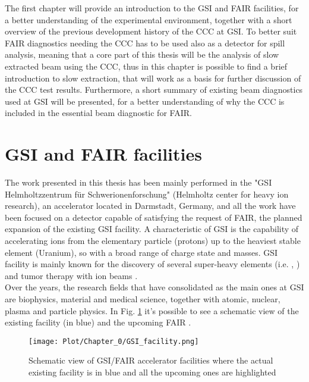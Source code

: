 \documentclass[12pt,a4paper]{report}
\begin{document}
	The first chapter will provide an introduction to the GSI and FAIR facilities, for a better understanding of the experimental environment, together with a short overview of the previous development history of the CCC at GSI. To better suit FAIR diagnostics needing the CCC has to be used also as a detector for spill analysis, meaning that a core part of this thesis will be the analysis of slow extracted beam using the CCC, thus in this chapter is possible to find a brief introduction to slow extraction, that will work as a basis for further discussion of the CCC test results. Furthermore, a short summary of existing beam diagnostics used at GSI will be presented, for a better understanding of why the CCC is included in the essential beam diagnostic for FAIR.\\
	\section{GSI and FAIR facilities}
	The work presented in this thesis has been mainly performed in the "GSI Helmholtzzentrum für Schwerionenforschung" (Helmholtz center for heavy ion research), an accelerator located in Darmstadt, Germany, and all the work have been focused on a detector capable of satisfying the request of FAIR, the planned expansion of the existing GSI facility. A characteristic of GSI is the capability of accelerating ions from the elementary particle (protons) up to the heaviest stable element (Uranium), so with a broad range of charge state and masses. GSI facility is mainly known for the discovery of several super-heavy elements (i.e. \cite{Elements1}, \cite{Elements2}) and tumor therapy with ion beams \cite{TumorTherapy}.\\
	Over the years, the research fields that have consolidated as the main ones at GSI are biophysics, material and medical science, together with atomic, nuclear, plasma and particle physics. In Fig. \ref{GSI} it's possible to see a schematic view of the existing facility (in blue) and the upcoming FAIR \cite{FAIR}. \\
	\begin{figure} [H]
		\centering
		\texttt{[image: Plot/Chapter\_0/GSI\_facility.png]}
		\caption{\small{Schematic view of GSI/FAIR accelerator facilities where the actual existing facility is in blue and all the upcoming ones are highlighted}}
		\label{GSI}
	\end{figure}
\end{document}
